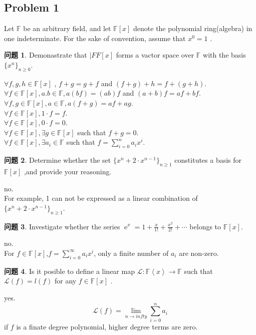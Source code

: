 \documentclass[11pt]{ctexart}
\theoremstyle{definition}
\newtheorem{qqq}{问题}[section]
\numberwithin{equation}{section}
\newcommand{\op}[1]{\operatorname{#1}}%
\newcommand{\FF}{\mathbb{F}}%
\theoremstyle{definition}
\theoremstyle{remark}
\begin{document}
\subsection{Problem 1}
Let $\FF$ be an arbitrary field, and let $\FF[x]$ denote the polynomial ring(algebra) in one indeterminate. For the sake
of convention, assume that $x^0=1$ .
\begin{qqq}
    Demonastrate that $|FF[x]$ forms a vactor space over $\FF$ with the basis $\{x^n\}_{n\geq 0}$.
\end{qqq}
\begin{aaa}
    $\forall f,g,h \in \FF[x]$ , $f+g = g+f $ and $(f+g)+h=f+(g+h)$.\\
    $\forall f \in \FF[x], a.b\in \FF , a(bf)=(ab) f$ and $(a+b)f=af+bf$.\\
    $\forall f,g \in \FF[x],a\in \FF, a(f+g)=af+ag$.\\
    $\forall f \in \FF[x], 1\cdot f=f$.\\
    $\forall f \in \FF[x], 0\cdot f=0$.\\
    $\forall f \in \FF[x], \exists g \in \FF[x]$ such that $f+g=0$.\\
    $\forall f \in \FF[x], \exists a_i \in \FF$ such that $f=\sum_{i=0}^{n}a_i x^i$.\\
\end{aaa}
\begin{qqq}
    Determine  whether  the  set $\{x^n+2\cdot x^{n-1}\}_{n \geq 1}$ constitutes  a  basis  for $\FF[x]$ ,and provide your reasoning.
\end{qqq}
\begin{aaa}
    no.\\
    For example, 1 can not be expressed as a linear combination of $\{x^n+2\cdot x^{n-1}\}_{n \geq 1}$.
\end{aaa}
\begin{qqq}
    Investigate whether the series $\op{e}^x=1+\frac{x}{1!}+\frac{x^2}{2!}+\cdots$ belongs to $\FF[x]$.
\end{qqq}
\begin{aaa}
    no.\\
    For $f \in \FF[x]$,$f=\sum_{i=0}^{\infty}a_ix^i$, only a finite number of $a_i$ are non-zero.
\end{aaa}
\begin{qqq}
    Is it posible to define a linear map $\mathcal{L}: \FF\left\langle x\right\rangle \rightarrow \FF$ such that $\mathcal{L}(f)=l(f)$ for any $f \in \FF[x]$ .
\end{qqq}
\begin{aaa}
    yes.\\
    $$\mathcal{L}(f)=\lim_{n \to infty}\sum_{i=0}^{n}a_i$$
    if $f$ is a finate degree polynomial, higher degree terms are zero.
\end{aaa}
\end{document}

